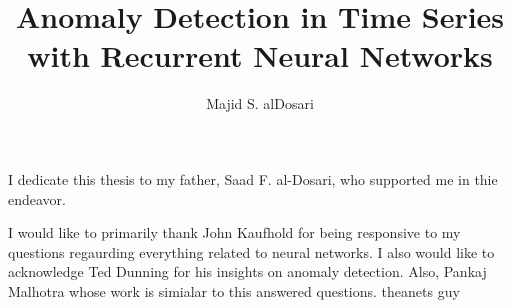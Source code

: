 \documentclass[11 pt]{report}
\begin{document}
\title{
  Anomaly Detection in Time Series\\
  with Recurrent Neural Networks}
\author{
Majid S. alDosari
}
\subject{(Computational Science)}







\signaturepage

\titlepage

\copyrightpage


\dedicationpage

\noindent I dedicate this thesis to my father, Saad F. al-Dosari, who supported me in thie endeavor.


\acknowledgementspage

\noindent
I would like to primarily thank John Kaufhold for being responsive to my questions regaurding everything related to neural networks. I also would like to acknowledge Ted Dunning for his insights on anomaly detection. Also, Pankaj Malhotra whose work is simialar to this answered questions. theanets guy


\tableofcontents
\end{document}
